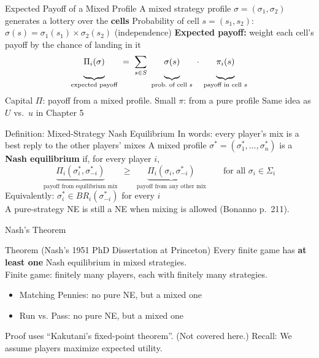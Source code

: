\begin{frame}{Expected Payoff of a Mixed Profile}
A mixed strategy profile $\sigma=(\sigma_1,\sigma_2)$ generates a lottery over the \textbf{cells}
\bsk
Probability of cell $s=(s_1,s_2)$: \quad $\sigma(s)=\sigma_1(s_1)\times\sigma_2(s_2)$ \hfill (independence)
\bsk
\textbf{Expected payoff:} weight each cell's payoff by the chance of landing in it
$$\underbrace{\Pi_i(\sigma)\vphantom{\sum_{s}}}_{\text{expected payoff}}\ =\ \sum_{s\in S}\ \underbrace{\sigma(s)\vphantom{\sum_{s}}}_{\text{prob.\ of cell }s}\ \cdot\ \underbrace{\pi_i(s)\vphantom{\sum_{s}}}_{\text{payoff in cell }s}$$
\bsk
Capital $\Pi$: payoff from a mixed profile. Small $\pi$: from a pure profile
\vfill
{\footnotesize Same idea as $U$ vs.\ $u$ in Chapter 5}
\vspace{-0.2in}
\end{frame}

\begin{frame}{Definition: Mixed-Strategy Nash Equilibrium}
In words: every player's mix is a best reply to the other players' mixes
\bsk
A mixed profile $\sigma^*=(\sigma_1^*,\ldots,\sigma_n^*)$ is a \textbf{Nash equilibrium} if, for every player $i$,
$$\underbrace{\Pi_i(\sigma_i^*,\sigma_{-i}^*)}_{\text{payoff from equilibrium mix}}\ \ \ge\ \ \underbrace{\Pi_i(\sigma_i,\sigma_{-i}^*)}_{\text{payoff from any other mix}}\qquad\text{for all }\sigma_i\in\Sigma_i$$
\bsk
Equivalently: $\sigma_i^* \in BR_i(\sigma_{-i}^*)$ for every $i$\\
\bsk
{}
\bsk
\vfill
{\footnotesize A pure-strategy NE is still a NE when mixing is allowed (Bonanno p.~211).}
\vspace{-0.2in}
\end{frame}

\begin{frame}{Nash's Theorem}
\begin{block}{Theorem (Nash's 1951 PhD Dissertation at Princeton)}
Every finite game has \textbf{at least one} Nash equilibrium in mixed strategies.\\
{\footnotesize Finite game: finitely many players, each with finitely many strategies.}
\end{block}
\bsk
\begin{itemize}
    \item Matching Pennies: no pure NE, but a mixed one
    \item Run vs. Pass: no pure NE, but a mixed one
\end{itemize}
\bsk
Proof uses ``Kakutani's fixed-point theorem''. (Not covered here.)
\vfill
Recall: We assume players maximize expected utility.
\vspace{-0.4in}
\end{frame}

